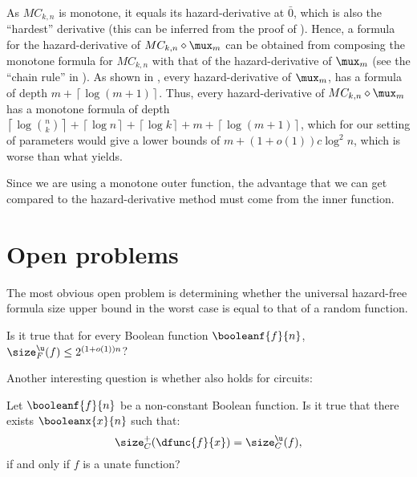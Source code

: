 \documentclass[acmsmall, nonacm, authorversion]{acmart}
\begin{document}
\begin{remark}
    As $MC_{k,n}$ is monotone, it equals its hazard-derivative at  $\bar{0}$, which is also the ``hardest'' derivative (this can be inferred from the proof of ). Hence, a formula for the hazard-derivative of $MC_{k,n} \diamond \mux_m$ can be obtained from composing the monotone formula for $MC_{k,n}$ with that of the hazard-derivative of $\mux_m$ (see the ``chain rule'' in \cite[Lemma 4.7]{IKL+19}).
    As shown in \cite[Proposition 1]{IK23}, every hazard-derivative of $\mux_m$, has a formula of depth $m+\left\lceil \log (m +1)\right\rceil$. Thus, every hazard-derivative of $MC_{k,n} \diamond \mux_m$ has a monotone formula of depth $\left\lceil\log \binom{n}{k}\right\rceil +\left\lceil \log n\right\rceil+\left\lceil \log k\right\rceil+m+\left\lceil \log (m +1)\right\rceil$, 
    which for our setting of parameters would give a lower bounds of $m + (1+o(1))c\log^2 n $, which is worse than what  yields. 
\end{remark}

\begin{remark}
    Since we are using a monotone outer function, the advantage that we can get compared to the hazard-derivative method must come from the inner function.
\end{remark}

\section{Open problems}\label{sec:open}
The most obvious open problem is determining whether the universal hazard-free formula size upper bound in the worst case is equal to that of a random function.

\begin{question}
    Is it true that for every Boolean function $\booleanf{f}{n}$, $\size_{F}^\u (f) \leq 2^{(1+o(1))n}$?
\end{question}

Another interesting question is whether  also holds for circuits:

\begin{question}
    Let $\booleanf{f}{n}$ be a non-constant Boolean function. Is it true that there exists $\booleanx{x}{n}$ such that:
\[
    \size_{C}^{+}(\dfunc{f}{x}) = \size_{C}^{\u}(f),
\]
if and only if $f$ is a unate function?
\end{question}
\end{document}
